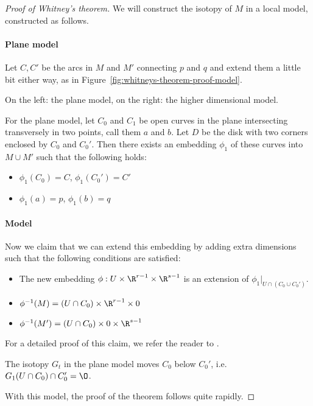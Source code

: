 \begin{proof}[Proof of Whitney's theorem]
    We will construct the isotopy of $M$ in a local model, constructed as follows.
    \paragraph{Plane model}
    Let $C, C'$ be the arcs in  $M$ and $M'$ connecting $p$ and  $q$ and extend them a little bit either way, as in Figure~\ref{fig:whitneys-theorem-proof-model}.
    \begin{marginfigure}
        \center
        \caption{On the left: the plane model, on the right: the higher dimensional model.}
        \label{fig:whitneys-theorem-proof-model}
    \end{marginfigure}
    For the plane model, let $C_0$ and $ C_1$ be open curves in the plane intersecting transversely in two points, call them $a$ and $b$.
    Let $D$ be the disk with two corners enclosed by $C_0$ and $C_0'$.
    Then there exists an embedding $\phi_1$ of these curves into $M \cup M'$ such that the following holds:
     \begin{itemize}
         \item $\phi_1(C_0) = C$, $\phi_1(C_0') = C'$
         \item $\phi_1(a) = p$, $\phi_1(b) = q$
    \end{itemize}
    \paragraph{Model}
    Now we claim that we can extend this embedding by adding extra dimensions such that the following conditions are satisfied:
    \begin{itemize}
        \item The new embedding $\phi: U \times \R^{r-1} \times \R^{s-1}$ is an extension of $\phi_1|_{U \cap (C_0 \cup C_0')}$.
        \item $\phi^{-1}(M) = (U \cap C_0) \times \R^{r-1} \times 0$
            \item $\phi^{-1}(M') = (U \cap C_0) \times 0\times \R^{s-1}$
    \end{itemize}
    For a detailed proof of this claim, we refer the reader to .
    \begin{marginfigure}
        \centering
        \caption{The isotopy $G_t$ in the plane model moves $C_0$ below $ C_0'$, i.e. $ G_1(U \cap C_0) \cap C_0' = \O$.}
        \label{fig:whitneys-theorem-model-isotopy}
    \end{marginfigure}
    With this model, the proof of the theorem follows quite rapidly.

\end{proof}
